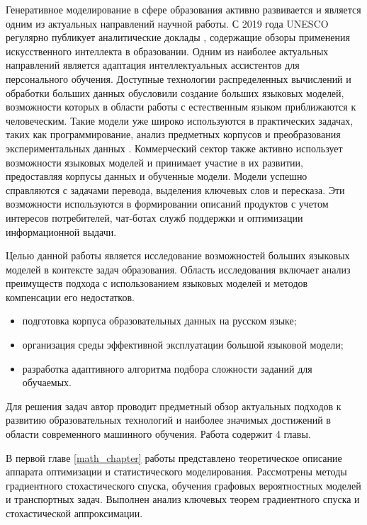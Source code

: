 Генеративное моделирование в сфере образования активно развивается и является одним из актуальных направлений научной работы. 
С 2019 года UNESCO регулярно публикует аналитические доклады \cite{unesco2019beijing}\cite{annuvs2024education},
содержащие обзоры применения искусственного интеллекта в образовании. Одним из наиболее актуальных направлений является адаптация
интеллектуальных ассистентов для персонального обучения. Доступные технологии распределенных вычислений и обработки больших данных обусловили 
создание больших языковых моделей, возможности которых в области работы с естественным языком приближаются к человеческим. Такие модели уже
широко используются в практических задачах, таких как программирование, анализ предметных корпусов и преобразования экспериментальных данных \cite{llamatouvron2023}. 
Коммерческий сектор также активно использует возможности языковых моделей и принимает участие в их развитии, предоставляя корпусы данных и обученные модели.
Модели успешно справляются с задачами перевода, выделения ключевых слов и пересказа. Эти возможности используются в формировании описаний продуктов с 
учетом интересов потребителей, чат-ботах служб поддержки и оптимизации информационной выдачи.

Целью данной работы является исследование возможностей больших языковых моделей в контексте задач образования. Область исследования
включает анализ преимуществ подхода с использованием языковых моделей и методов компенсации его недостатков.
\begin{itemize}
    \item подготовка корпуса образовательных данных на русском языке;
    \item организация среды эффективной эксплуатации большой языковой модели;
    \item разработка адаптивного алгоритма подбора сложности заданий для обучаемых.
\end{itemize}

Для решения задач автор проводит предметный обзор актуальных подходов к развитию образовательных технологий и
наиболее значимых достижений в области современного машинного обучения. Работа содержит 4 главы.

В первой главе \ref{math_chapter} работы представлено теоретическое описание аппарата оптимизации и статистического моделирования. 
Рассмотрены методы градиентного стохастического спуска, обучения графовых вероятностных моделей и транспортных задач. 
Выполнен анализ ключевых теорем градиентного спуска и стохастической аппроксимации. 

